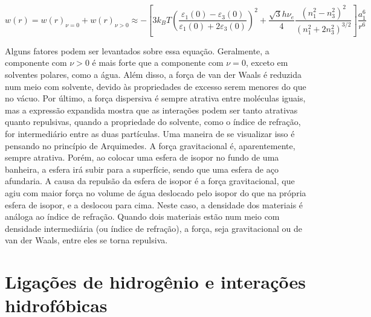 	\begin{equation}
		w ( r ) = w ( r ) _ { \nu = 0 } + w ( r ) _ { \nu > 0 } \approx - \left[ 3 k_B T \left( \frac { \varepsilon _ { 1 } ( 0 ) - \varepsilon _ { 3 } ( 0 ) } { \varepsilon _ { 1 } ( 0 ) + 2 \varepsilon _ { 3 } ( 0 ) } \right) ^ { 2 } + \frac { \sqrt { 3 } h \nu _ { e } } { 4 } \frac { \left( n _ { 1 } ^ { 2 } - n _ { 3 } ^ { 2 } \right) ^ { 2 } } { \left( n _ { 1 } ^ { 2 } + 2 n _ { 3 } ^ { 2 } \right) ^ { 3 / 2 } } \right] \frac { a _ { 1 } ^ { 6 } } { r ^ { 6 } }
		\label{eqn:energia_maclachlan}
	\end{equation} 
	
	Alguns fatores podem ser levantados sobre essa equação. Geralmente, a componente com \(\nu > 0\) é mais forte que a componente com \(\nu = 0\), exceto em solventes polares, como a água. Além disso, a força de van der Waals é reduzida num meio com solvente, devido às propriedades de excesso serem menores do que no vácuo. Por último, a força dispersiva é sempre atrativa entre moléculas iguais\cite{Hamaker1937}, mas a expressão expandida mostra que as interações podem ser tanto atrativas quanto repulsivas, quando a propriedade do solvente, como o índice de refração, for intermediário entre as duas partículas. Uma maneira de se visualizar isso é pensando no princípio de Arquimedes. A força gravitacional é, aparentemente, sempre atrativa. Porém, ao colocar uma esfera de isopor no fundo de uma banheira, a esfera irá subir para a superfície, sendo que uma esfera de aço afundaria. A causa da repulsão da esfera de isopor é a força gravitacional, que agiu com maior força no volume de água deslocado pelo isopor do que na própria esfera de isopor, e a deslocou para cima. Neste caso, a densidade dos materiais é análoga ao índice de refração. Quando dois materiais estão num meio com densidade intermediária (ou índice de refração), a força, seja gravitacional ou de van der Waals, entre eles se torna repulsiva.
	
	\section{Ligações de hidrogênio e interações hidrofóbicas}   \label{sec:ligacoes_hidrogenio}
	
